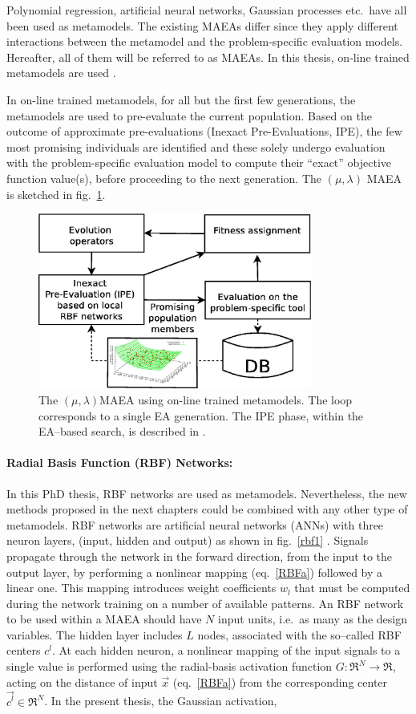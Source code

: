 Polynomial regression, artificial neural networks, Gaussian processes etc.\ have all been used as metamodels. The existing MAEAs differ since they apply different interactions between the metamodel and the problem-specific evaluation models. Hereafter, all of them will be referred to as MAEAs. In this thesis, on-line trained metamodels are used \cite{LTT_2_018,LTT_2_020,LTT_2_029}. 
 
In on-line trained metamodels, for all but the first few generations, the metamodels are used to pre-evaluate the current population. Based on the outcome of approximate pre-evaluations (Inexact Pre-Evaluations, IPE), the few most promising individuals are identified and these solely undergo evaluation with the problem-specific evaluation model to compute their ``exact''  objective function value(s), before proceeding to the next generation. The $(\mu,\lambda)$ MAEA is sketched in fig.\ \ref{MAEA}.


\begin{figure}[h!]
\centering
\includegraphics[width=90mm]{MAEA.eps} 
\caption{The $(\mu,\lambda)$MAEA using on-line trained metamodels. The loop corresponds to a single EA generation. The IPE phase, within the EA--based search, is described in \cite{LTT_2_018,LTT_2_020,LTT_2_029}. }
\label{MAEA}
\end{figure}


\paragraph{Radial Basis Function (RBF) Networks:}
In this PhD thesis, RBF networks are used as metamodels. Nevertheless, the new methods proposed in the next chapters could be combined with any other type of metamodels. RBF networks are artificial neural networks (ANNs) with three neuron layers, (input, hidden and output) as shown in fig.\ \ref{rbf1} \cite{Hayk1999}. Signals propagate through the network in the forward direction, from the input to the output layer, by performing a nonlinear mapping (eq.\ \ref{RBFa}) followed by a linear one. This mapping introduces weight coefficients $w_l$ that must be computed during the network training on a number of available patterns. An RBF network to be used within a MAEA should have $N$ input units, i.e.\ as many as the  design variables. The hidden layer includes $L$ nodes, associated with the so–called RBF centers $c^l$. At each hidden neuron, a nonlinear mapping of the input signals to a single value is performed using the radial-basis activation function $G:\Re^N \rightarrow \Re$, acting on the distance of input $\vec{x}$ (eq.\ \ref{RBFa}) from the corresponding center $\vec{c^l} \in \Re^N$.  In the present thesis, the Gaussian activation, 

